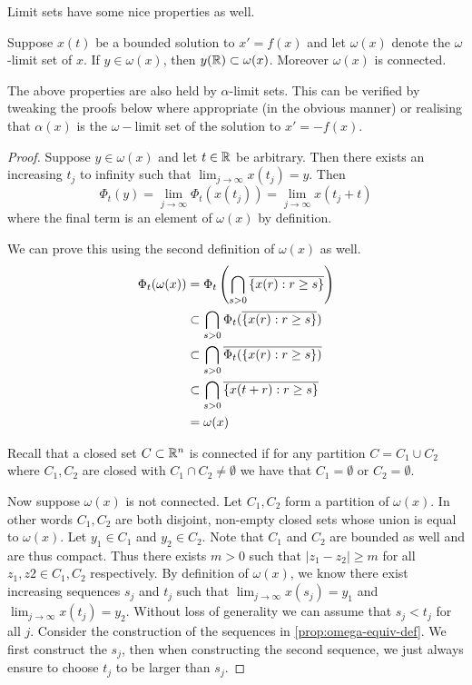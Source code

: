 Limit sets have some nice properties as well. 
\begin{proposition}\label{prop:omega-properties}
Suppose $x(t)$ be a bounded solution to $x' = f(x)$ and let $\omega(x)$ denote the $\omega$-limit set of $x$. If $y \in \omega(x)$, then $y(\mathbb{R}) \subset \omega(x)$. Moreover $\omega(x)$ is connected.
\end{proposition}
\begin{remark}
The above properties are also held by $\alpha$-limit sets. This can be verified by tweaking the proofs below where appropriate (in the obvious manner) or realising that $\alpha(x)$ is the $\omega-$limit set of the solution to $x' = -f(x)$.
\end{remark}
\begin{proof}
Suppose $y \in \omega(x)$ and let $t \in \mathbb{R}$ be arbitrary. Then there exists an increasing $t_j$ to infinity such that $\lim_{j \to \infty} x(t_j) = y$. Then
$$ \Phi_t(y) = \lim_{j \to \infty} \Phi_t(x(t_j)) = \lim_{j \to \infty} x(t_j + t) $$
where the final term is an element of $\omega(x)$ by definition.

We can prove this using the second definition of $\omega(x)$ as well.
\begin{align*}
    \Phi_t(\omega(x)) &= \Phi_t \left( \bigcap_{s > 0} \overline{\{x(r): r \geq s\}} \right)\\
    &\subset \bigcap_{s > 0} \Phi_t (\overline{\{x(r) : r \geq s\}})\\
    &\subset \bigcap_{s > 0} \overline{ \Phi_t(\{x(r): r \geq s\}) }\\
    &\subset \bigcap_{s > 0} \overline{\{x(t + r): r \geq s\}}\\
    &= \omega(x)
\end{align*}

Recall that a closed set $C \subset \mathbb{R}^n$ is connected if for any partition $C = C_1 \cup C_2$ where $C_1, C_2$ are closed with $C_1 \cap C_2 \neq \emptyset$ we have that $C_1 = \emptyset$ or $C_2 = \emptyset$.

Now suppose $\omega(x)$ is not connected. Let $C_1, C_2$ form a partition of $\omega(x)$. In other words $C_1, C_2$ are both disjoint, non-empty closed sets whose union is equal to $\omega(x)$. Let $y_1 \in C_1$ and $y_2 \in C_2$. Note that $C_1$ and $C_2$ are bounded as well and are thus compact. Thus there exists $m > 0$ such that $|z_1 - z_2| \geq m$ for all $z_1, z2 \in C_1, C_2$ respectively. By definition of $\omega(x)$, we know there exist increasing sequences $s_j$ and $t_j$ such that $\lim_{j \to \infty} x(s_j) = y_1$ and $\lim_{j \to \infty} x(t_j) = y_2$.  Without loss of generality we can assume that $s_j < t_j$ for all $j$. Consider the construction of the sequences in \autoref{prop:omega-equiv-def}. We first construct the $s_j$, then when constructing the second sequence, we just always ensure to choose $t_j$ to be larger than $s_j$.


\end{proof}
